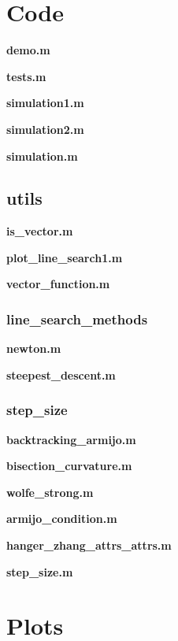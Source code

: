 \documentclass[a4paper,11pt]{article}
\numberwithin{equation}{section} %
\begin{document}
\label{code}
\section{Code}

\textbf{demo.m}

% 
\textbf{tests.m}

\textbf{simulation1.m}

\textbf{simulation2.m}

\textbf{simulation.m}



\subsection{utils}
\textbf{is\_vector.m}

\textbf{plot\_line\_search1.m}

\textbf{vector\_function.m}


\subsubsection{line\_search\_methods}
\textbf{newton.m}

\textbf{steepest\_descent.m}


\subsubsection{step\_size}
\textbf{backtracking\_armijo.m}

\textbf{bisection\_curvature.m}

\textbf{wolfe\_strong.m}

\textbf{armijo\_condition.m}

\textbf{hanger\_zhang\_attrs\_attrs.m}

\textbf{step\_size.m}




\clearpage

\label{plots}
\section{Plots}



\clearpage





\end{document}
